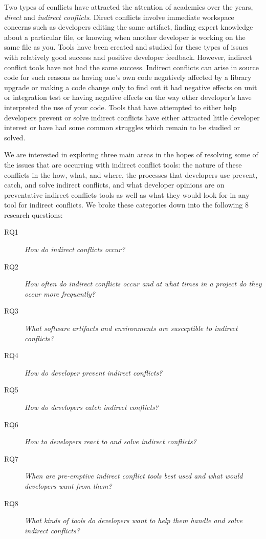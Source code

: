 \documentclass[conference]{IEEEtran}
\begin{document}
Two types of conflicts have attracted the attention of academics over the years, \textit{direct} and 
\textit{indirect conflicts}. Direct conflicts involve immediate workspace concerns such as developers editing the same
artifact, finding expert knowledge about a particular file, or knowing when another developer is working on
the same file as you. Tools have been created and studied for these types of issues
~\cite{Xiang:2008:ERT, Biehl:2007:FVD, Sarma:2009:TIV, Khurana:2009:PFC} with relatively good success and 
positive developer feedback. However, indirect conflict tools have not had the same success. Indirect conflicts
can arise in source code for such reasons as having one's own code negatively affected by a library upgrade or
making a code change only to find out it had negative effects on unit or integration test or  having negative effects
on the way other developer's have interpreted the use of your code. Tools that have attempted to either
help developers prevent or solve indirect conflicts have either attracted little developer interest or have
had some common struggles which remain to be studied or solved.


We are interested in exploring three main areas in the hopes of resolving some of the issues that are occurring
with indirect conflict tools: the nature of these conflicts in the how, what, and where, the processes that
developers use prevent, catch, and solve indirect conflicts, and what developer opinions are on preventative 
indirect conflicts tools as well as what they would look for in any tool for indirect conflicts. We broke
these categories down into the following 8 research questions:

\begin{description}
	\item[RQ1] \textit{How do indirect conflicts occur?}
	\item[RQ2] \textit{How often do indirect conflicts occur and at what times in a project do they occur more frequently?}
	\item[RQ3] \textit{What software artifacts and environments are susceptible to indirect conflicts?}
	\item[RQ4] \textit{How do developer prevent indirect conflicts?}
	\item[RQ5] \textit{How do developers catch indirect conflicts?}
	\item[RQ6] \textit{How to developers react to and solve indirect conflicts?}
	\item[RQ7] \textit{When are pre-emptive indirect conflict tools best used and what would developers want from them?}
	\item[RQ8] \textit{What kinds of tools do developers want to help them handle and solve indirect conflicts?}
\end{description}
\end{document}

